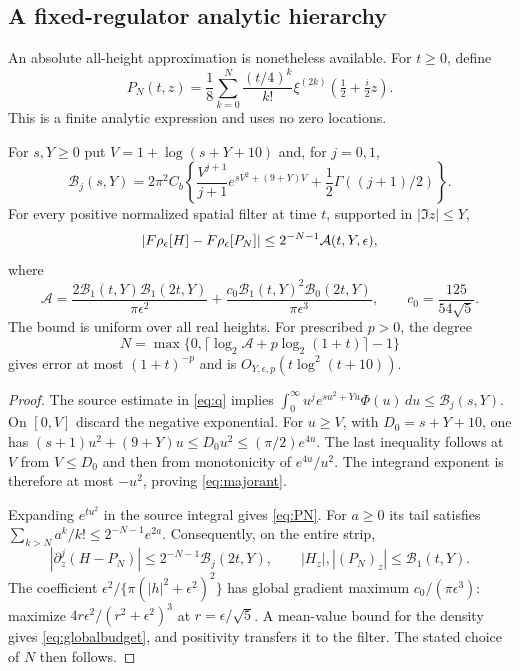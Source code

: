 \subsection{A fixed-regulator analytic hierarchy}

An absolute all-height approximation is nonetheless available.
For $t\ge0$, define
\begin{equation}
 P_N(t,z)=\frac18\sum_{k=0}^N\frac{(t/4)^k}{k!}
                   \xi^{(2k)}(\tfrac12+\tfrac i2z).
 \label{eq:PN}
\end{equation}
This is a finite analytic expression and uses no zero locations.

\begin{theorem}\label{thm:global}
For $s,Y\ge0$ put $V=1+\log(s+Y+10)$ and, for $j=0,1$,
\begin{equation}
 \mathcal B_j(s,Y)=2\pi^2C_b
 \left\{\frac{V^{j+1}}{j+1}e^{sV^2+(9+Y)V}
                    +\frac12\Gamma((j+1)/2)\right\}.
 \label{eq:majorant}
\end{equation}
For every positive normalized spatial filter at time $t$, supported in $|\Im z|\le Y$,
\begin{equation}
 |F\rho_\epsilon[H]-F\rho_\epsilon[P_N]|
 \le 2^{-N-1}\mathcal A(t,Y,\epsilon), \label{eq:globalbudget}
\end{equation}
where
\begin{equation}
 \mathcal A=
 \frac{2\mathcal B_1(t,Y)\mathcal B_1(2t,Y)}{\pi\epsilon^2}
 +\frac{c_0\mathcal B_1(t,Y)^2\mathcal B_0(2t,Y)}{\pi\epsilon^3},
 \qquad c_0=\frac{125}{54\sqrt5}.
 \label{eq:Aglobal}
\end{equation}
The bound is uniform over all real heights.
For prescribed $p>0$, the degree
\[
 N=\max\{0,\lceil\log_2\mathcal A+p\log_2(1+t)\rceil-1\}
\]
gives error at most $(1+t)^{-p}$ and is
$O_{Y,\epsilon,p}(t\log^2(t+10))$.
\end{theorem}
\begin{proof}
The source estimate in \eqref{eq:q} implies
$\int_0^\infty u^je^{su^2+Yu}\Phi(u)\,du\le\mathcal B_j(s,Y)$.
On $[0,V]$ discard the negative exponential.
For $u\ge V$, with $D_0=s+Y+10$, one has
$(s+1)u^2+(9+Y)u\le D_0u^2\le(\pi/2)e^{4u}$.
The last inequality follows at $V$ from $V\le D_0$ and then from
monotonicity of $e^{4u}/u^2$.
The integrand exponent is therefore at most $-u^2$, proving
\eqref{eq:majorant}.

Expanding $e^{tu^2}$ in the source integral gives \eqref{eq:PN}.
For $a\ge0$ its tail satisfies
$\sum_{k>N}a^k/k!\le2^{-N-1}e^{2a}$.
Consequently, on the entire strip,
\[
 |\partial_z^j(H-P_N)|\le2^{-N-1}\mathcal B_j(2t,Y),\qquad
 |H_z|,|(P_N)_z|\le\mathcal B_1(t,Y).
\]
The coefficient $\epsilon^2/\{\pi(|h|^2+\epsilon^2)^2\}$
has global gradient maximum $c_0/(\pi\epsilon^3)$:
maximize $4r\epsilon^2/(r^2+\epsilon^2)^3$ at
$r=\epsilon/\sqrt5$. A mean-value bound for the density gives
\eqref{eq:globalbudget}, and positivity transfers it to the filter.
The stated choice of $N$ then follows.
\end{proof}
